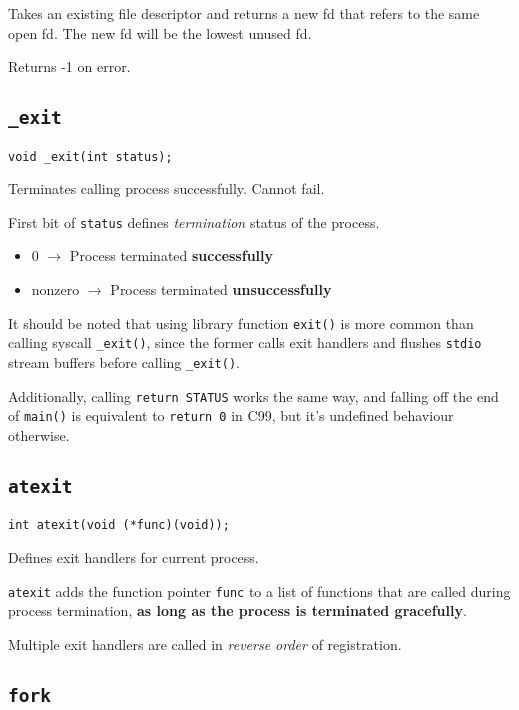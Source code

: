 \documentclass{article}
\begin{document}
Takes an existing file descriptor and returns a new fd that refers to the same open fd. The new fd will be the lowest unused fd.

Returns -1 on error.


\subsection{\texttt{\_exit}}

\begin{verbatim}
void _exit(int status);
\end{verbatim}

Terminates calling process successfully. Cannot fail.

First bit of \texttt{status} defines \textit{termination} status of the process.

\begin{itemize}
    \item 0 $\rightarrow$ Process terminated \textbf{successfully}
    \item nonzero $\rightarrow$ Process terminated \textbf{unsuccessfully}
\end{itemize}

It should be noted that using library function \texttt{exit()} is more common than calling syscall \texttt{\_exit()}, since the former calls exit handlers and flushes \texttt{stdio} stream buffers before calling \texttt{\_exit()}.

Additionally, calling \texttt{return STATUS} works the same way, and falling off the end of \texttt{main()} is equivalent to \texttt{return 0} in C99, but it's undefined behaviour otherwise.


\subsection{\texttt{atexit}}

\begin{verbatim}
int atexit(void (*func)(void));
\end{verbatim}

Defines exit handlers for current process.

\texttt{atexit} adds the function pointer \texttt{func} to a list of functions that are called during process termination, \textbf{as long as the process is terminated gracefully}.

Multiple exit handlers are called in \textit{reverse order} of registration.


\subsection{\texttt{fork}}
\end{document}
